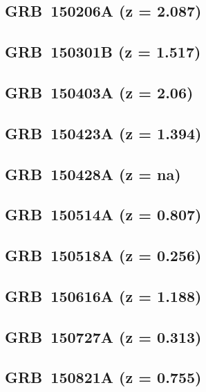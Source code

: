 \documentclass{aa}    %
\begin{document}
\subsection{GRB~150206A (z = 2.087)}	



\subsection{GRB~150301B (z = 1.517)}	



\subsection{GRB~150403A (z = 2.06)}	



\subsection{GRB~150423A (z = 1.394)}	



\subsection{GRB~150428A (z = na)}	



\subsection{GRB~150514A (z = 0.807)}	



\subsection{GRB~150518A (z = 0.256)}	



\subsection{GRB~150616A (z = 1.188)}	



\subsection{GRB~150727A (z = 0.313)}	



\subsection{GRB~150821A (z = 0.755)}	
\end{document}
